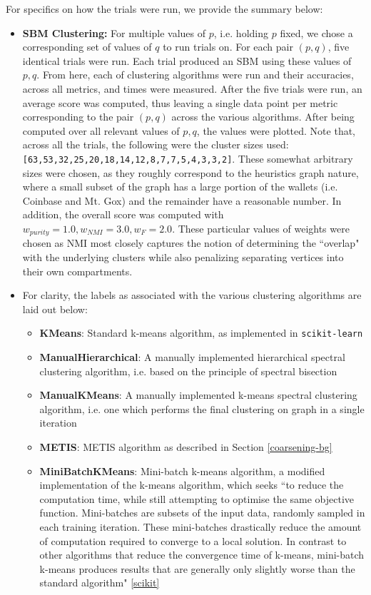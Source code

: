 \documentclass{article}
\begin{document}
For specifics on how the trials were run, we provide the summary below:
\begin{itemize}
    \item \textbf{SBM Clustering:} For multiple values of $p$, i.e. holding $p$ fixed, we chose a corresponding set of values of $q$ to run trials on. For each pair $(p,q)$, five identical trials were run. Each trial produced an SBM using these values of $p,q$. From here, each of clustering algorithms were run and their accuracies, across all metrics, and times were measured. After the five trials were run, an average score was computed, thus leaving a single data point per metric corresponding to the pair $(p,q)$ across the various algorithms. After being computed over all relevant values of $p,q$, the values were plotted. Note that, across all the trials, the following were the cluster sizes used: \texttt{[63,53,32,25,20,18,14,12,8,7,7,5,4,3,3,2]}. These somewhat arbitrary sizes were chosen, as they roughly correspond to the heuristics graph nature, where a small subset of the graph has a large portion of the wallets (i.e. Coinbase and Mt. Gox) and the remainder have a reasonable number. In addition, the overall score was computed with $w_{purity}=1.0,w_{NMI}=3.0,w_{F}=2.0$. These particular values of weights were chosen as NMI most closely captures the notion of determining the ``overlap" with the underlying clusters while also penalizing separating vertices into their own compartments. 
    \item For clarity, the labels as associated with the various clustering algorithms are laid out below:
    \begin{itemize}
        \item \textbf{KMeans}: Standard k-means algorithm, as implemented in \texttt{scikit-learn}
        \item \textbf{ManualHierarchical}: A manually implemented hierarchical spectral clustering algorithm, i.e. based on the principle of spectral bisection
        \item \textbf{ManualKMeans}: A manually implemented k-means spectral clustering algorithm, i.e. one which performs the final clustering on graph in a single iteration
        \item \textbf{METIS}: METIS algorithm as described in Section \ref{coarsening-bg}
        \item \textbf{MiniBatchKMeans}: Mini-batch k-means algorithm, a modified implementation of the k-means algorithm, which seeks ``to reduce the computation time, while still attempting to optimise the same objective function. Mini-batches are subsets of the input data, randomly sampled in each training iteration. These mini-batches drastically reduce the amount of computation required to converge to a local solution. In contrast to other algorithms that reduce the convergence time of k-means, mini-batch k-means produces results that are generally only slightly worse than the standard algorithm" \ref{scikit}

\end{itemize}
\end{itemize}
\end{document}
